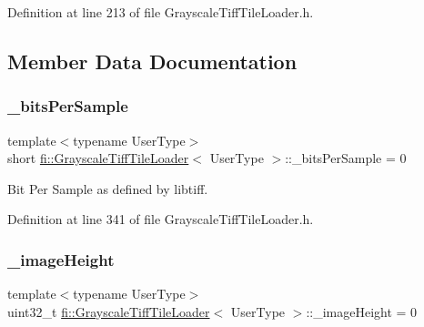 Definition at line 213 of file Grayscale\+Tiff\+Tile\+Loader.\+h.



\subsection{Member Data Documentation}
\mbox{\label{classfi_1_1GrayscaleTiffTileLoader_a2c1f9f110d5ff19c064be417e381a7f6}} 
\subsubsection{\texorpdfstring{\+\_\+bits\+Per\+Sample}{\_bitsPerSample}}
{\footnotesize\ttfamily template$<$typename User\+Type$>$ \\
short \hyperlink{classfi_1_1GrayscaleTiffTileLoader}{fi\+::\+Grayscale\+Tiff\+Tile\+Loader}$<$ User\+Type $>$\+::\+\_\+bits\+Per\+Sample = 0\hspace{0.3cm}{\ttfamily [private]}}



Bit Per Sample as defined by libtiff. 



Definition at line 341 of file Grayscale\+Tiff\+Tile\+Loader.\+h.

\mbox{\label{classfi_1_1GrayscaleTiffTileLoader_a39968153f81f5cb790291f5f5da84c25}} 
\subsubsection{\texorpdfstring{\+\_\+image\+Height}{\_imageHeight}}
{\footnotesize\ttfamily template$<$typename User\+Type$>$ \\
uint32\+\_\+t \hyperlink{classfi_1_1GrayscaleTiffTileLoader}{fi\+::\+Grayscale\+Tiff\+Tile\+Loader}$<$ User\+Type $>$\+::\+\_\+image\+Height = 0\hspace{0.3cm}{\ttfamily [private]}}



